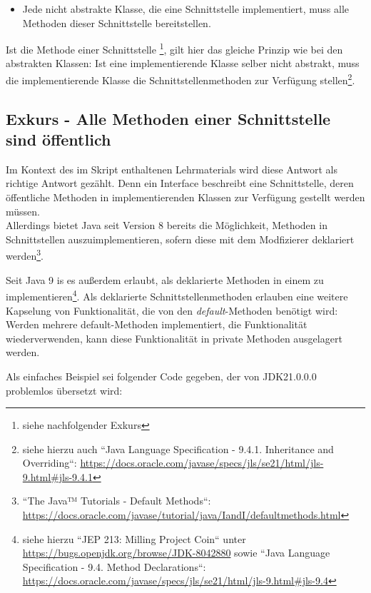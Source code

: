 \begin{itemize}
    \item Jede nicht abstrakte Klasse, die eine Schnittstelle implementiert, muss alle Methoden dieser Schnittstelle bereitstellen.
\end{itemize}

Ist die Methode einer Schnittstelle \footnote{siehe nachfolgender Exkurs}, gilt hier das gleiche Prinzip wie bei den abstrakten Klassen:
Ist eine implementierende Klasse selber nicht abstrakt, muss die implementierende Klasse die Schnittstellenmethoden zur Verfügung stellen\footnote{
siehe hierzu auch ``Java Language Specification - 9.4.1. Inheritance and Overriding``: \url{https://docs.oracle.com/javase/specs/jls/se21/html/jls-9.html#jls-9.4.1}
}.

\subsection*{Exkurs - Alle Methoden einer Schnittstelle sind öffentlich}

Im Kontext des im Skript enthaltenen Lehrmaterials wird diese Antwort als richtige Antwort gezählt.
Denn ein Interface beschreibt eine Schnittstelle, deren öffentliche Methoden in implementierenden Klassen zur Verfügung gestellt werden müssen.
\\

Allerdings bietet Java seit Version 8 bereits die Möglichkeit, Methoden in Schnittstellen auszuimplementieren, sofern diese mit dem Modfizierer  deklariert werden\footnote{
    ``The Java™ Tutorials - Default Methods``: \url{https://docs.oracle.com/javase/tutorial/java/IandI/defaultmethods.html}
}.

Seit Java 9 is es außerdem erlaubt, als  deklarierte Methoden in einem  zu implementieren\footnote{
siehe hierzu ``JEP 213: Milling Project Coin`` unter \url{https://bugs.openjdk.org/browse/JDK-8042880} sowie ``Java Language Specification - 9.4. Method Declarations``: \url{https://docs.oracle.com/javase/specs/jls/se21/html/jls-9.html#jls-9.4}
}.
Als  deklarierte Schnittstellenmethoden erlauben eine weitere Kapselung von Funktionalität, die von den \textit{default}-Methoden
benötigt wird: Werden mehrere default-Methoden implementiert, die Funktionalität wiederverwenden, kann diese Funktionalität in private Methoden ausgelagert werden.

Als einfaches Beispiel sei folgender Code gegeben, der von JDK21.0.0.0 problemlos übersetzt wird:


